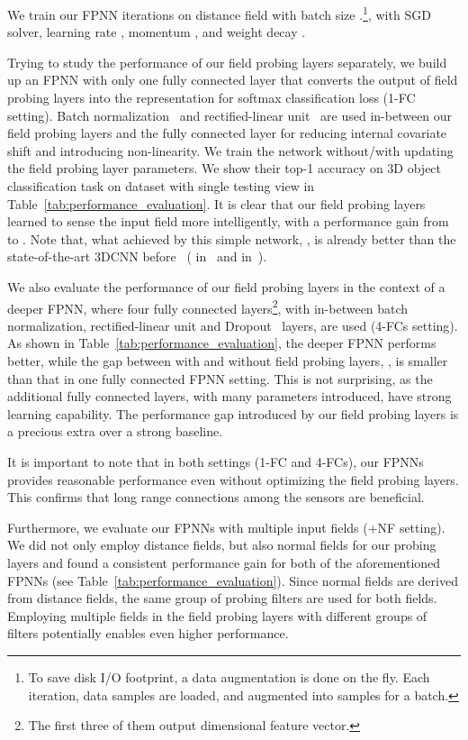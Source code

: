 \documentclass{article}
\begin{document}
We train our FPNN  iterations on  distance field with batch size .\footnote{To save disk I/O footprint, a data augmentation is done on the fly. Each iteration,  data samples are loaded, and augmented into  samples for a batch.}, with SGD solver, learning rate , momentum , and weight decay .

Trying to study the performance of our field probing layers separately, we build up an FPNN with only one fully connected layer that converts the output of field probing layers into the representation for softmax classification loss (1-FC setting). Batch normalization~\cite{ioffe2015batch} and rectified-linear unit~\cite{nair2010rectified} are used in-between our field probing layers and the fully connected layer for reducing internal covariate shift and introducing non-linearity. We train the network without/with updating the field probing layer parameters. We show their top-1 accuracy on 3D object classification task on  dataset with single testing view in Table~\ref{tab:performance_evaluation}. It is clear that our field probing layers learned to sense the input field more intelligently, with a  performance gain from  to . Note that, what achieved by this simple network, , is already better than the state-of-the-art 3DCNN before~\cite{qi2016volumetric} ( in~\cite{WU_CVPR15_3D} and  in~\cite{Maturana_IROS15_VoxNet}).

We also evaluate the performance of our field probing layers in the context of a deeper FPNN, where four fully connected layers\footnote{The first three of them output  dimensional feature vector.}, with in-between batch normalization, rectified-linear unit and Dropout~\cite{srivastava2014dropout} layers, are used (4-FCs setting). As shown in Table~\ref{tab:performance_evaluation}, the deeper FPNN performs better, while the gap between with and without field probing layers, , is smaller than that in one fully connected FPNN setting. This is not surprising, as the additional fully connected layers, with many parameters introduced, have strong learning capability. The  performance gap introduced by our field probing layers is a precious extra over a strong baseline.

It is important to note that in both settings (1-FC and 4-FCs), our FPNNs provides reasonable performance even without optimizing the field probing layers. This confirms that long range connections among the sensors are beneficial.

Furthermore, we evaluate our FPNNs with multiple input fields (+NF setting). We did not only employ distance fields, but also normal fields for our probing layers and found a consistent performance gain for both of the aforementioned FPNNs (see Table~\ref{tab:performance_evaluation}). Since normal fields are derived from distance fields, the same group of probing filters are used for both fields. Employing multiple fields in the field probing layers with different groups of filters potentially enables even higher performance.
\end{document}
